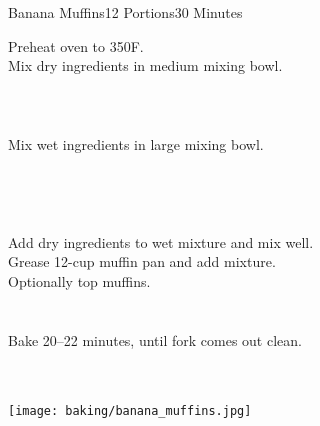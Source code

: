 \begin{recipe}{Banana Muffins}{12 Portions}{30 Minutes}

Preheat oven to 350\degrees F.\\

Mix dry ingredients in medium mixing bowl.\\~\\~\\~\\

Mix wet ingredients in large mixing bowl.\\~\\~\\~\\~\\

\newstep
Add dry ingredients to wet mixture and mix well.\\

\newstep
Grease 12-cup muffin pan and add mixture.\\

Optionally top muffins.\\~\\~\\

\newstep
Bake 20--22 minutes, until fork comes out clean.

\end{recipe}

\begin{center}
~\\~\\
\texttt{[image: baking/banana\_muffins.jpg]}
\end{center}